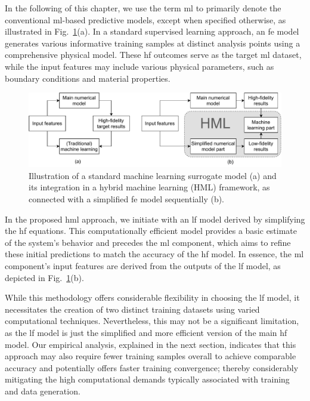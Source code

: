 \documentclass[12pt,a4paper]{report}
\begin{document}
In the following of this chapter, we use the term \ac{ml} to primarily denote the conventional \ac{ml}-based predictive models, except when specified otherwise, as illustrated in Fig.~\ref{fig:ml_system}(a). In a standard supervised learning approach, an \ac{fe} model generates various informative training samples at distinct analysis points using a comprehensive physical model. These \ac{hf} outcomes serve as the target \ac{ml} dataset, while the input features may include various physical parameters, such as boundary conditions and material properties.
%
\begin{figure}[H]\centering
\includegraphics[width=\textwidth]{img/ML.pdf}
\caption{Illustration of a standard machine learning surrogate model (a) and its integration in a hybrid machine learning (HML) framework, as connected with a simplified \ac{fe} model sequentially (b).
\label{fig:ml_system}}
\end{figure}

In the proposed \ac{hml} approach, we initiate with an \ac{lf} model derived by simplifying the \ac{hf} equations. This computationally efficient model provides a basic estimate of the system's behavior and precedes the \ac{ml} component, which aims to refine these initial predictions to match the accuracy of the \ac{hf} model. In essence, the \ac{ml} component's input features are derived from the outputs of the \ac{lf} model, as depicted in Fig.~\ref{fig:ml_system}(b).

While this methodology offers considerable flexibility in choosing the \ac{lf} model, it necessitates the creation of two distinct training datasets using varied computational techniques. Nevertheless, this may not be a significant limitation, as the \ac{lf} model is just the simplified and more efficient version of the main \ac{hf} model. Our empirical analysis, explained in the next section, indicates that this approach may also require fewer training samples overall to achieve comparable accuracy and potentially offers faster training convergence; thereby considerably mitigating the high computational demands typically associated with training and data generation.
\end{document}
